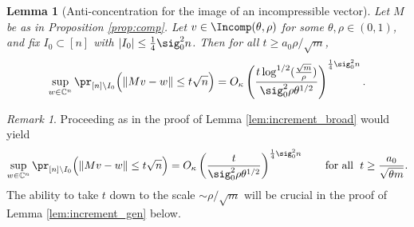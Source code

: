 \documentclass[aop,preprint]{imsart}
\theoremstyle{plain}
\newtheorem{lemma}[theorem]{Lemma}
\theoremstyle{definition}
\theoremstyle{remark}
\newtheorem{remark}[theorem]{Remark}
\numberwithin{equation}{section}
\numberwithin{theorem}{section}
\begin{document}
\begin{lemma}[Anti-concentration for the image of an incompressible vector]	\label{lem:anti_incomp}
Let $M$ be as in Proposition \ref{prop:comp}.
Let $v\in \Incomp(\theta,\rho)$ for some $\theta,\rho\in (0,1)$, and fix $I_0\subset [n]$ with $|I_0|\le \frac14\sig_0^2n$.
Then for all $t\ge a_0\rho/\sqrt{m}$,
\begin{equation}
\sup_{w\in \C^n} \pr_{[n]\setminus I_0} \Big( \|Mv-w\| \le t \sqrt{n} \Big) = O_\kappa\left(\frac{t\log^{1/2}(\frac{\sqrt{m}}{\rho})}{\sig_0^2\rho \theta^{1/2}}\right)^{\frac14\sig_0^2n}.
\end{equation}
\end{lemma}

\begin{remark}
Proceeding as in the proof of Lemma \ref{lem:increment_broad} would yield 
\begin{equation}
\sup_{w\in \C^n} \pr_{[n]\setminus I_0} \Big( \|Mv-w\| \le t \sqrt{n} \Big) = O_\kappa\left(\frac{t}{\sig_0^2\rho \theta^{1/2}}\right)^{\frac14\sig_0^2n} \quad\quad \text{for all }\; t\ge \frac{a_0}{\sqrt{\theta m}}.
\end{equation}
The ability to take $t$ down to the scale $\sim \rho/\sqrt{m}$ will be crucial in the proof of Lemma \ref{lem:increment_gen} below.
\end{remark}
\end{document}
